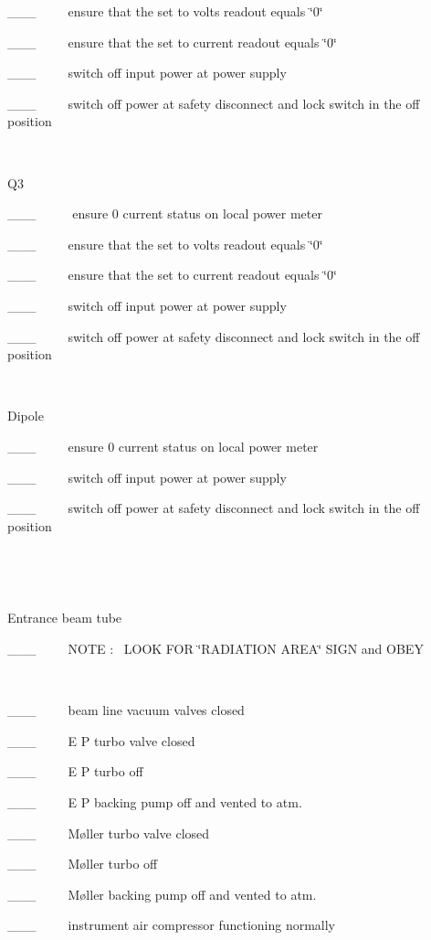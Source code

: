 \_\_\_~~~~~ensure that the set to volts readout equals \char`\"{}0\char`\"{}

\_\_\_~~~~~ensure that the set to current readout equals \char`\"{}0\char`\"{}

\_\_\_~~~~~switch off input power at power supply

\_\_\_~~~~~switch off power at safety disconnect and lock switch in the off
position

~

Q3

\_\_\_~~~~~ ensure 0 current status on local power meter 

\_\_\_~~~~~ensure that the set to volts readout equals \char`\"{}0\char`\"{}

\_\_\_~~~~~ensure that the set to current readout equals \char`\"{}0\char`\"{}

\_\_\_~~~~~switch off input power at power supply

\_\_\_~~~~~switch off power at safety disconnect and lock switch in the off
position

~

Dipole

\_\_\_~~~~~ensure 0 current status on local power meter 

\_\_\_~~~~~switch off input power at power supply

\_\_\_~~~~~switch off power at safety disconnect and lock switch in the off
position

~~

~

Entrance beam tube

\_\_\_~~~~~NOTE :~ LOOK FOR \char`\"{}RADIATION AREA\char`\"{} SIGN and OBEY

~

\_\_\_~~~~~beam line vacuum valves closed

\_\_\_~~~~~E P turbo valve closed

\_\_\_~~~~~E P turbo off 

\_\_\_~~~~~E P backing pump off and vented to atm.

\_\_\_~~~~~M{\o}ller turbo valve closed

\_\_\_~~~~~M{\o}ller turbo off 

\_\_\_~~~~~M{\o}ller backing pump off and vented to atm.

\_\_\_~~~~~instrument air compressor functioning normally

~

~

~~~~~~~~~~~~~~~~

